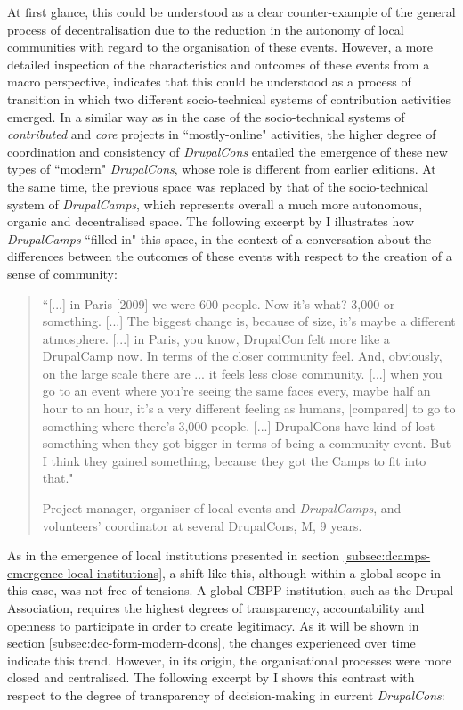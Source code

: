 At first glance, this could be understood as a clear counter-example of the general process of decentralisation due to the reduction in the autonomy of local communities with regard to the organisation of these events. However, a more detailed inspection of the characteristics and outcomes of these events from a macro perspective, indicates that this could be understood as a process of transition in which two different socio-technical systems of contribution activities emerged. In a similar way as in the case of the socio-technical systems of \textit{contributed} and \textit{core} projects in ``mostly-online" activities, the higher degree of coordination and consistency of \textit{DrupalCons} entailed the emergence of these new types of ``modern" \textit{DrupalCons}, whose role is different from earlier editions. At the same time, the previous space was replaced by that of the socio-technical system of \textit{DrupalCamps}, which represents overall a much more autonomous, organic and decentralised space.  The following excerpt by I illustrates how \textit{DrupalCamps} ``filled in" this space, in the context of a conversation about the differences between the outcomes of these events with respect to the creation of a sense of community:

\begin{quotation}
``[...] in Paris [2009] we were 600 people. Now it's what? 3,000 or something. [...] The biggest change is, because of size, it's maybe a different atmosphere. [...] in Paris, you know, DrupalCon felt more like a DrupalCamp now. In terms of the closer community feel. And, obviously, on the large scale there are ... it feels less close community. [...] when you go to an event where you're seeing the same faces every, maybe half an hour to an hour, it's a very different feeling as humans, [compared] to go to something where there's 3,000 people. [...] DrupalCons have kind of lost something when they got bigger in terms of being a community event. But I think they gained something, because they got the Camps to fit into that."

\begin{flushright}\footnotesize{Project manager, organiser of local events and \textit{DrupalCamps}, and volunteers' coordinator at several DrupalCons, M, 9 years.}\end{flushright}
\end{quotation}

As in the emergence of local institutions presented in section \ref{subsec:dcamps-emergence-local-institutions}, a shift like this, although within a global scope in this case, was not free of tensions. A global CBPP institution, such as the Drupal Association, requires the highest degrees of transparency, accountability and openness to participate in order to create legitimacy. As it will be shown in section \ref{subsec:dec-form-modern-dcons}, the changes experienced over time indicate this trend. However, in its origin, the organisational processes were more closed and centralised. The following excerpt by I  shows this contrast with respect to the degree of transparency of decision-making in current \textit{DrupalCons}:

